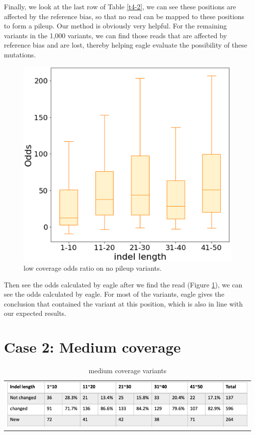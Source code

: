 Finally, we look at the last row of Table \ref{t4-2}, we can see these positions are affected by the reference bias, so that no read can be mapped to these positions to form a pileup. Our method is obviously very helpful. For the remaining variants in the 1,000 variants, we can find those reads that are affected by reference bias and are lost, thereby helping eagle evaluate the possibility of these mutations.

\begin{figure}[H]
    \centering
    \includegraphics[width=0.6\columnwidth]{body/image/4-6.png}
    \captionsetup{labelfont=bf}
    \renewcommand{\baselinestretch}{1.0}
    \caption[low coverage variants odds]{low coverage odds ratio on no pileup variants.}
    \label{f4-6}
\end{figure}

Then see the odds calculated by eagle after we find the read (Figure \ref{f4-6}), we can see the odds calculated by eagle. For most of the variants, eagle gives the conclusion that contained the variant at this position, which is also in line with our expected results.


\section{Case 2: Medium coverage}
\begin{center}
\begin{table}[h]
    \centering
    \caption[medium coverage variants]{medium coverage variants}
    \vspace{-0.5cm}
    \begin{tabular}{c}
        \includegraphics[width=1\textwidth]{body/image/t4-4.png}
    \end{tabular}
    \label{t4-4}
\end{table}
\end{center}

